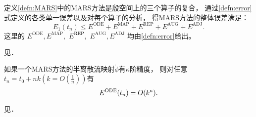 \begin{thm}
定义\ref{defn:MARS}中的MARS方法是殷空间上的三个算子的复合，
通过\eqref{defn:error}式定义的各类单一误差以及对每个算子的分析，
得MARS方法的整体误差满足：
 \begin{equation}
\label{eq:E1parts}
E_1(t_n)  \le E^{\mathrm{ODE}} + E^{\mathrm{MAP}}
+ E^{\mathrm{REP}} + E^{\mathrm{AUG}} + E^{\mathrm{ADJ}}.
\end{equation}
这里的 $E^{\mathrm{ODE}},$$E^{\mathrm{MAP}},$
$E^{\mathrm{REP}},$ $E^{\mathrm{AUG}},$$E^{\mathrm{ADJ}}$
均由\eqref{defn:error}给出。
\end{thm}

\begin{pro}
  见\cite{zhang2016mars}． 
\end{pro}

\begin{prop}
  \label{ODEerror}
  如果一个MARS方法的半离散流映射$\mathring{ \phi}$有$\kappa$阶精度，
  则对任意$t_n = t_0 + nk(k = O(\frac{1}{n}))$有
  \begin{displaymath}
    E^{\rm{ODE}}(t_n) = O(k^{\kappa}).
  \end{displaymath}
\end{prop}
\begin{pro}
  见\cite{zhang2016mars}．
\end{pro}
